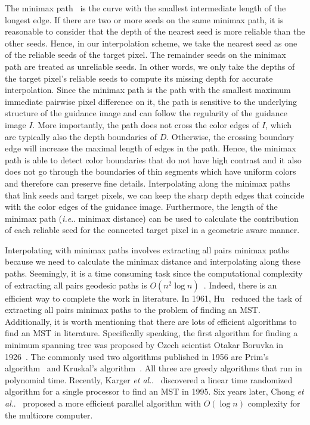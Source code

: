 \documentclass[preprint,10pt,5p,times,twocolumn]{elsarticle}
\makeatletter
\DeclareRobustCommand\onedot{\futurelet\@let@token\@onedot}
\def\@onedot{\ifx\@let@token.\else.\null\fi\xspace}
\def\ie{\emph{i.e}\onedot} \def\Ie{\emph{I.e}\onedot}
\def\etal{\emph{et al}\onedot}
\makeatother
\begin{document}
The minimax path~\cite{Pollack1960} is the curve with the smallest intermediate length of the longest edge. If there are two or more seeds on the same minimax path, it is reasonable to consider that the depth of the nearest seed is more reliable than the other seeds. Hence, in our interpolation scheme, we take the nearest seed as one of the reliable seeds of the target pixel. The remainder seeds on the minimax path are treated as unreliable seeds. In other words, we only take the depths of the target pixel's reliable seeds to compute its missing depth for accurate interpolation. %
Since the minimax path is the path with the smallest maximum immediate pairwise pixel difference on it, the path is sensitive to the underlying structure of the guidance image and can follow the regularity of the guidance image $I$. More importantly, the path does not cross the color edges of $I$, which are typically also the depth boundaries of $D$. Otherwise, the crossing boundary edge will increase the maximal length of edges in the path.
Hence, the minimax path is able to detect color boundaries that do not have high contrast and it also does not go through the boundaries of thin segments which have uniform colors and therefore can preserve fine details. Interpolating along the minimax paths that link seeds and target pixels, we can keep the sharp depth edges that coincide with the color edges of the guidance image. Furthermore, the length of the minimax path (\ie minimax distance) can be used to calculate the contribution of each reliable seed for the connected target pixel in a geometric aware manner.

Interpolating with minimax paths involves extracting all pairs minimax paths because we need to calculate the minimax distance and interpolating along these paths. Seemingly, it is a time consuming task since the computational complexity of extracting all pairs geodesic paths is $O(n^2 \log n)$~\cite{Johnson_JACM_1977}. Indeed, there is an efficient way to complete the work in literature. In 1961, Hu~\cite{Hu1961} reduced the task of extracting all pairs minimax paths to the problem of finding an MST. Additionally, it is worth mentioning that there are lots of efficient algorithms to find an MST in literature. Specifically speaking, the first algorithm for finding a minimum spanning tree was proposed by Czech scientist Otakar Boruvka in 1926~\cite{boruvka_1926}. The commonly used two algorithms published in 1956 are Prim's algorithm~\cite{Prim_BSTJ_1957} and Kruskal's algorithm~\cite{Kruskal_AMS_1956}. All three are greedy algorithms that run in polynomial time. Recently, Karger \etal~\cite{Karger1995} discovered a linear time randomized algorithm for a single processor to find an MST in 1995. Six years later, Chong \etal~\cite{Chong2001} proposed a more efficient parallel algorithm with $O(\log n)$ complexity for the multicore computer.
\end{document}
